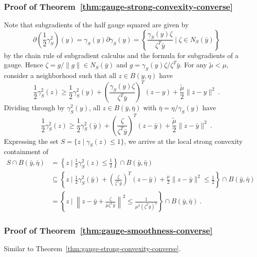 \documentclass[sn-mathphys,Numbered]{sn-jnl}%
\begin{document}
\subsubsection{Proof of Theorem~\ref{thm:gauge-strong-convexity-converse}} \label{pf:gauge-strong-convexity-converse}
Note that subgradients of the half gauge squared are given by
\begin{equation} \label{eq:subgrad_gauge_square}
 \partial \left(\frac{1}{2}\gamma^2_S\right)(y)=\gamma_S(y) \partial \gamma_S(y) = \left\{\frac{\gamma_S(y)\zeta}{\zeta^T\bar y} \mid \zeta\in N_S(\bar y)\right\}
\end{equation}
by the chain rule of subgradient calculus and the formula for subgradients of a gauge. Hence $\zeta=g/\|g\|\in N_S(\bar y)$ and $g = \gamma_S(y)\zeta/\zeta^T\bar y$. For any $\tilde \mu < \mu$, consider a neighborhood such that all $z\in B(y,\eta)$ have
$$\frac{1}{2}\gamma^2_S(z) \geq \frac{1}{2}\gamma^2_S(y) + \left(\frac{\gamma_S(y)\zeta}{\zeta^T\bar y}\right)^T(z-y) + \frac{\tilde\mu}{2}\|z-y\|^2 \ . $$
Dividing through by $\gamma^2_S(y)$, all $z\in B(\bar y,\bar \eta)$ with $\bar\eta = \eta/\gamma_S(y)$ have
$$\frac{1}{2}\gamma^2_S(z) \geq \frac{1}{2}\gamma^2_S(\bar y) + \left(\frac{\zeta}{\zeta^T\bar y}\right)^T(z-\bar y) + \frac{\tilde\mu}{2}\|z-\bar y\|^2 \ . $$
Expressing the set $S = \{z \mid \gamma_S(z) \leq 1\}$, we arrive at the local strong convexity containment of
\begin{align*}
    S \cap B(\bar y, \bar \eta) &=\left\{z \mid \frac{1}{2}\gamma^2_S(z) \leq \frac{1}{2}\right\} \cap B(\bar y, \bar \eta) \\
    &\subseteq \left\{z \mid \frac{1}{2}\gamma^2_S(\bar y)+ \left(\frac{\zeta}{\zeta^T\bar y}\right)^T(z- \bar y)+\frac{\mu}{2}\|z- \bar y\|^2 \leq \frac{1}{2}\right\} \cap B(\bar y, \bar \eta) \\
    &=\left\{z \mid \left\|z-\bar y +\frac{\zeta}{\mu\zeta^T\bar y}\right\|^2 \leq \frac{1}{\mu^2(\zeta^T\bar y)^2} \right\} \cap B(\bar y, \bar \eta) \ .
\end{align*}

\subsubsection{Proof of Theorem~\ref{thm:gauge-smoothness-converse}} 
Similar to Theorem~\ref{thm:gauge-strong-convexity-converse}. \label{pf:gauge-smoothness-converse}


    
\end{document}
